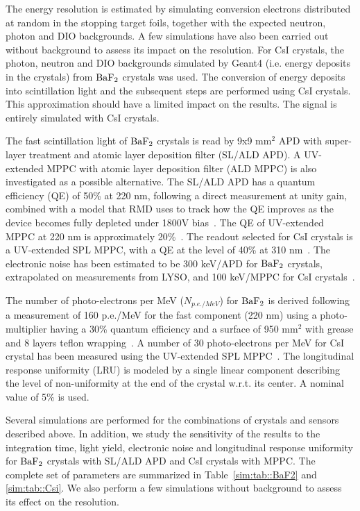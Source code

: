 The energy resolution is estimated by simulating conversion electrons distributed at random in the stopping target foils, 
together with the expected neutron, photon and DIO backgrounds. A few simulations have also been carried out without 
background to assess its impact on the resolution. For CsI crystals, the photon, neutron and DIO backgrounds simulated by Geant4 
(i.e. energy deposits in the crystals) from $\rm BaF_2$ crystals was used. The conversion of energy deposits into scintillation 
light and the subsequent steps are performed using CsI crystals. This approximation should have a limited impact on the results. 
The signal is entirely simulated with CsI crystals. 

The fast scintillation light of $\rm BaF_2$ crystals is read by 9x9 mm$^2$ APD with super-layer treatment and atomic layer deposition 
filter (SL/ALD APD). A UV-extended MPPC with atomic layer deposition filter (ALD MPPC) is also investigated as a possible alternative. 
The SL/ALD APD has a quantum efficiency (QE) of 50\% at 220 nm, following a direct measurement at unity gain, combined with a model 
that RMD uses to track how the QE improves as the device becomes fully depleted under 1800V bias~\cite{docdb-david}. The QE of 
UV-extended MPPC at 220 nm is approximately 20\%~. The readout selected for CsI crystals is a UV-extended SPL MPPC, with a 
QE at the level of 40\% at 310 nm~\cite{docdb5166}. The electronic noise has been estimated to be 300 keV/APD for $\rm BaF_2$ crystals, 
extrapolated on measurements from LYSO, and 100 keV/MPPC for CsI crystals~\cite{docdb5405}.  

The number of photo-electrons per MeV ($N_{p.e./ MeV}$) for $\rm BaF_2$ is derived following a measurement of 160 p.e./MeV for the fast 
component (220 nm) using a photo-multiplier having a 30\% quantum efficiency and a surface of 950 mm$^2$ with grease and 8 layers teflon 
wrapping~\cite{docdb5716}. A number of 30 photo-electrons per MeV for CsI crystal has been measured using the UV-extended SPL 
MPPC~\cite{docdb5166}. The longitudinal response uniformity (LRU) is modeled by a single linear component describing the level of 
non-uniformity at the end of the crystal w.r.t. its center. A nominal value of 5\% is used.
 
Several simulations are performed for the combinations of crystals and sensors described above. In addition, we study the sensitivity of 
the results to the integration time, light yield, electronic noise and longitudinal response uniformity for $\rm BaF_2$ crystals with 
SL/ALD APD and CsI crystals with MPPC. The complete set of parameters are summarized in Table~\ref{sim:tab::BaF2} and \ref{sim:tab::Csi}. 
We also perform a few simulations without background to assess its effect on the resolution. 

